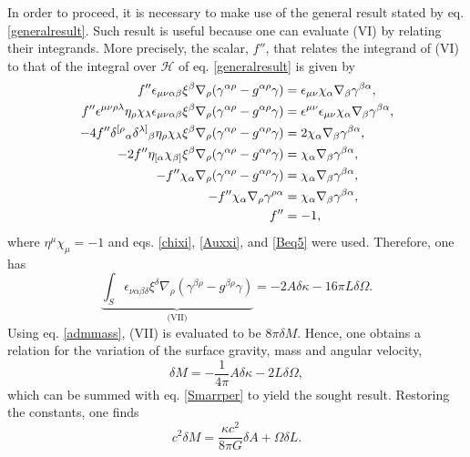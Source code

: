 \documentclass[
12pt,		%
openright,	%
twoside,  %
a4paper,			%
chapter=TITLE,		%
english,			%
french,				%
spanish,			%
brazil				%
]{USPSC-classe/USPSC}
\begin{document}
In order to proceed, it is necessary to make use of the general result stated by eq. \ref{generalresult}. Such result is useful because one can evaluate (VI) by relating their integrands. More precisely, the scalar, $f''$, that relates the integrand of (VI) to that of the integral over $\mathscr{H}$ of eq. \ref{generalresult} is given by
\begin{equation}
\begin{aligned}[b]
f''\epsilon_{\mu\nu\alpha\beta}\xi^{\beta}\nabla_{\rho}(\gamma^{\alpha\rho}-g^{\alpha\rho}\gamma) &= \epsilon_{\mu\nu}\chi_{\alpha}\nabla_{\beta}\gamma^{\beta\alpha},\\
 f''\epsilon^{\mu\nu\rho\lambda}\eta_{\rho}\chi_{\lambda}\epsilon_{\mu\nu\alpha\beta}\xi^{\beta}\nabla_{\rho}(\gamma^{\alpha\rho}-g^{\alpha\rho}\gamma)&=\epsilon^{\mu\nu}\epsilon_{\mu\nu}\chi_{\alpha}\nabla_{\beta}\gamma^{\beta\alpha},\\
 -4f''\delta^{[\rho}\mathstrut_{\alpha}\delta^{\lambda]}\mathstrut_{\beta}\eta_{\rho}\chi_{\lambda}\xi^{\beta}\nabla_{\rho}(\gamma^{\alpha\rho}-g^{\alpha\rho}\gamma)&=2\chi_{\alpha}\nabla_{\beta}\gamma^{\beta\alpha},\\
 -2f''\eta_{[\alpha}\chi_{\beta]}\xi^{\beta}\nabla_{\rho}(\gamma^{\alpha\rho}-g^{\alpha\rho}\gamma)&=\chi_{\alpha}\nabla_{\beta}\gamma^{\beta\alpha},\\
 -f''\chi_{\alpha}\nabla_{\rho}(\gamma^{\alpha\rho}-g^{\alpha\rho}\gamma)&=\chi_{\alpha}\nabla_{\beta}\gamma^{\beta\alpha},\\
 -f''\chi_{\alpha}\nabla_{\rho}\gamma^{\rho\alpha}&=\chi_{\alpha}\nabla_{\beta}\gamma^{\beta\alpha},\\
 f''&=-1,
\end{aligned}    
\end{equation}
where $\eta^{\mu}\chi_{\mu}=-1$ and eqs. \ref{chixi}, \ref{Auxxi}, and \ref{Beq5} were used. Therefore, one has
\begin{equation}
    \underbrace{\int_S\epsilon_{\nu\alpha\beta\delta}\xi^{\delta}\nabla_{\rho}(\gamma^{\beta\rho}-g^{\beta\rho}\gamma)}_{\text{(VII)}}=-2A\delta\kappa-16\pi L\delta\Omega.
\end{equation}
Using eq. \ref{admmass}, (VII) is evaluated to be $8\pi \delta M$. Hence, one obtains a relation for the variation of the surface gravity, mass and angular velocity,
\begin{equation}\label{kappavar}
    \delta M=-\frac{1}{4\pi}A\delta\kappa-2L\delta\Omega,
\end{equation} 
which can be summed with eq. \ref{Smarrper} to yield the sought result. Restoring the constants, one finds
\begin{equation}\label{first}
    c^2\delta M=\frac{\kappa c^2}{8\pi G}\delta A+\Omega\delta L.
\end{equation}
\end{document}
